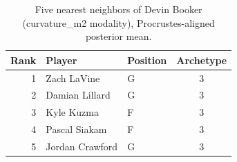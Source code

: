 \begin{table}[htbp]
  \centering\small
  \begin{tabular}{rllc}
    \toprule
    Rank & Player & Position & Archetype \\
    \midrule
    1 & Zach LaVine & G & 3 \\
    2 & Damian Lillard & G & 3 \\
    3 & Kyle Kuzma & F & 3 \\
    4 & Pascal Siakam & F & 3 \\
    5 & Jordan Crawford & G & 3 \\
    \bottomrule
  \end{tabular}
  \caption{Five nearest neighbors of Devin Booker (curvature_m2 modality), Procrustes-aligned posterior mean.}
  \label{tab:Devin_Booker_neighbors_curvature_m2}
\end{table}

